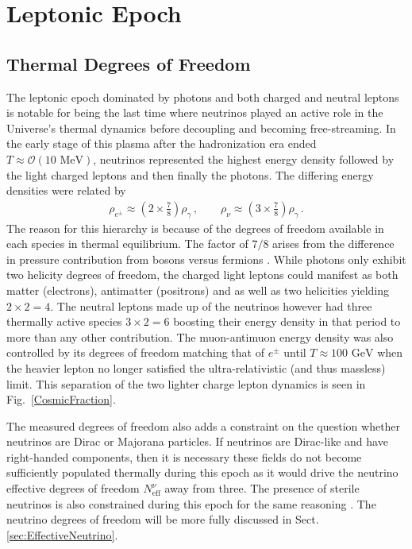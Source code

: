 \documentclass[universe,article,submit,moreauthors,pdftex,a4paper]{Definitions/mdpi}
\newcommand{\GeV}{\text{ GeV}}
\newcommand{\MeV}{\text{ MeV}}
\newcommand*{\rf}[1]{Fig.~{\ref{#1}}}
\newcommand*{\rsec}[1]{Sect.\,{\ref{#1}}}
\begin{document}
\section{Leptonic Epoch} \label{sec:Leptonic}
\subsection{Thermal Degrees of Freedom}\label{sec:Freedom}
\noindent The leptonic epoch dominated by photons and both charged and neutral leptons is notable for being the last time where neutrinos played an active role in the Universe's thermal dynamics before decoupling and becoming free-streaming. In the early stage of this plasma after the hadronization era ended $T\approx\mathcal{O}(10\MeV)$, neutrinos represented the highest energy density followed by the light charged leptons and then finally the photons. The differing energy densities were related by
\begin{align}
\rho_{e^{\pm}}\approx\left(2\times\frac{7}{8}\right)\rho_{\gamma}\,,\qquad\rho_{\nu}\approx\left(3\times\frac{7}{8}\right)\rho_{\gamma}\,.
\end{align}
The reason for this hierarchy is because of the degrees of freedom \cite{Rafelski:2013yka} available in each species in thermal equilibrium. The factor of $7/8$ arises from the difference in pressure contribution from bosons versus fermions \cite{Rafelski:2013yka}. While photons only exhibit two helicity degrees of freedom, the charged light leptons could manifest as both matter (electrons), antimatter (positrons) and as well as two helicities yielding $2\times2=4$. The neutral leptons made up of the neutrinos however had three thermally active species $3\times2=6$ boosting their energy density in that period to more than any other contribution. The muon-antimuon energy density was also controlled by its degrees of freedom matching that of $e^{\pm}$ until $T\approx100\GeV$ when the heavier lepton no longer satisfied the ultra-relativistic (and thus massless) limit. This separation of the two lighter charge lepton dynamics is seen in \rf{CosmicFraction}.

The measured degrees of freedom also adds a constraint on the question whether neutrinos are Dirac or Majorana particles. If neutrinos are Dirac-like and have right-handed components, then it is necessary these fields do not become sufficiently populated thermally during this epoch as it would drive the neutrino effective degrees of freedom $N^{\nu}_{\mathrm{eff}}$ away from three. The presence of sterile neutrinos is also constrained during this epoch for the same reasoning \cite{Lello:2014yha}. The neutrino degrees of freedom will be more fully discussed in \rsec{sec:EffectiveNeutrino}.
\end{document}
